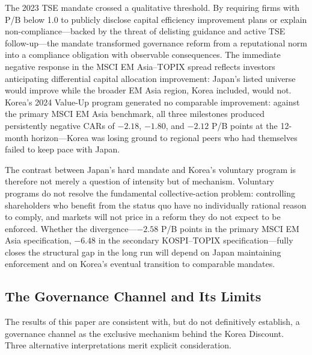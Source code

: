 The 2023 TSE mandate crossed a qualitative threshold. By requiring firms with P/B below 1.0 to publicly disclose capital efficiency improvement plans or explain non-compliance---backed by the threat of delisting guidance and active TSE follow-up---the mandate transformed governance reform from a reputational norm into a compliance obligation with observable consequences. The immediate negative response in the MSCI EM Asia--TOPIX spread reflects investors anticipating differential capital allocation improvement: Japan's listed universe would improve while the broader EM Asia region, Korea included, would not. Korea's 2024 Value-Up program generated no comparable improvement: against the primary MSCI EM Asia benchmark, all three milestones produced persistently negative CARs of $-2.18$, $-1.80$, and $-2.12$ P/B points at the 12-month horizon---Korea was losing ground to regional peers who had themselves failed to keep pace with Japan.

The contrast between Japan's hard mandate and Korea's voluntary program is therefore not merely a question of intensity but of mechanism. Voluntary programs do not resolve the fundamental collective-action problem: controlling shareholders who benefit from the status quo have no individually rational reason to comply, and markets will not price in a reform they do not expect to be enforced. Whether the divergence---$-2.58$ P/B points in the primary MSCI EM Asia specification, $-6.48$ in the secondary KOSPI--TOPIX specification---fully closes the structural gap in the long run will depend on Japan maintaining enforcement and on Korea's eventual transition to comparable mandates.

\subsection{The Governance Channel and Its Limits}

The results of this paper are consistent with, but do not definitively establish, a governance channel as the exclusive mechanism behind the Korea Discount. Three alternative interpretations merit explicit consideration.


